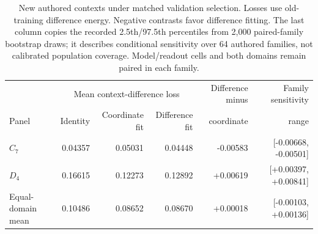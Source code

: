 \begin{table}[t]
\centering\small\setlength{\tabcolsep}{3pt}
\begin{tabular}{@{}lrrrrr@{}}
\toprule
& \multicolumn{3}{c}{Mean context-difference loss} & Difference minus & Family sensitivity \\
Panel & Identity & Coordinate fit & Difference fit & coordinate & range \\
\midrule
$C_7$ & 0.04357 & 0.05031 & 0.04448 & -0.00583 & [-0.00668, -0.00501] \\
$D_4$ & 0.16615 & 0.12273 & 0.12892 & +0.00619 & [+0.00397, +0.00841] \\
Equal-domain mean & 0.10486 & 0.08652 & 0.08670 & +0.00018 & [-0.00103, +0.00136] \\
\bottomrule
\end{tabular}
\caption{New authored contexts under matched validation selection. Losses use old-training difference energy. Negative contrasts favor difference fitting. The last column copies the recorded 2.5th/97.5th percentiles from 2,000 paired-family bootstrap draws; it describes conditional sensitivity over 64 authored families, not calibrated population coverage. Model/readout cells and both domains remain paired in each family.}
\label{tab:followup-context}
\end{table}

